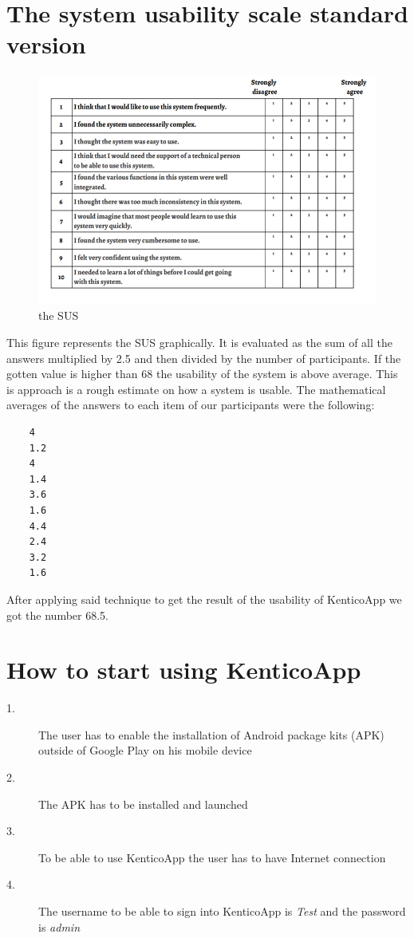 \appendixpageoff
\begin{appendices}
\chapter{The system usability scale standard version}
\begin{figure}[ht!]
  \centering
  \includegraphics[width=\textwidth]{Images/SUS.png}
  \caption{the SUS}
  \label{susImagelabel}
\end{figure}
This figure represents the SUS graphically. It is evaluated as the sum of all the answers multiplied by 2.5 and then divided by the number of participants. If the gotten value is higher than 68 the usability of the system is above average. This is approach is a rough estimate on how a system is usable.
The mathematical averages of the answers to each item of our participants were the following: 
\lstset{style=sharpc, numbers=left}
\begin{lstlisting}
	4
	1.2
	4
	1.4
	3.6
	1.6
	4.4
	2.4
	3.2
	1.6
\end{lstlisting}
After applying said technique to get the result of the usability of KenticoApp we got the number 68.5. 

\chapter{How to start using KenticoApp}
\begin{description}
\item[1.] The user has to enable the installation of Android package kits (APK) outside of Google Play on his mobile device
\item[2.] The APK has to be installed and launched
\item[3.] To be able to use KenticoApp the user has to have Internet connection
\item[4.] The username to be able to sign into KenticoApp is \textit{Test} and the password is \textit{admin}
\end{description}


\end{appendices}
